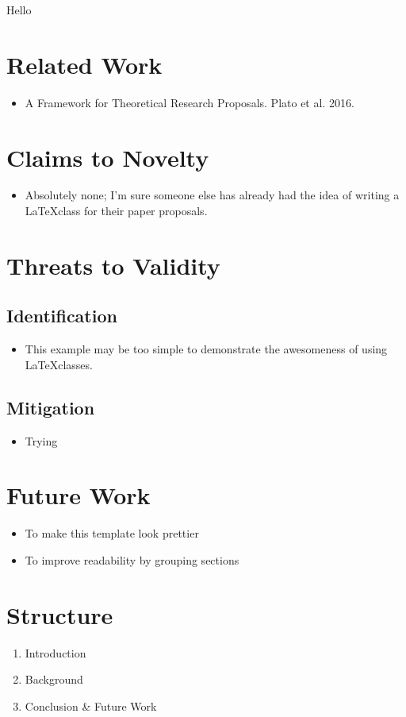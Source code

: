 \documentclass{paper_proposal}
\begin{document}

Hello

\section{Related Work}
\begin{itemize}
  \item A Framework for Theoretical Research Proposals. Plato et al. 2016.
\end{itemize}

%
\section{Claims to Novelty}
\begin{itemize}
  \item Absolutely none; I'm sure someone else has already had the idea of
    writing a \LaTeX class for their paper proposals.
\end{itemize}

\section{Threats to Validity}

\subsection{Identification}
\begin{itemize}
  \item This example may be too simple to demonstrate the awesomeness of using
    \LaTeX classes.
\end{itemize}

\subsection{Mitigation}
\begin{itemize}
  \item Trying 
\end{itemize}

\section{Future Work}
\begin{itemize}
  \item To make this template look prettier
  \item To improve readability by grouping sections
\end{itemize}

\section{Structure}

\begin{enumerate}
  \item Introduction
  \item Background
  \item Conclusion \& Future Work
\end{enumerate}
\end{document}
